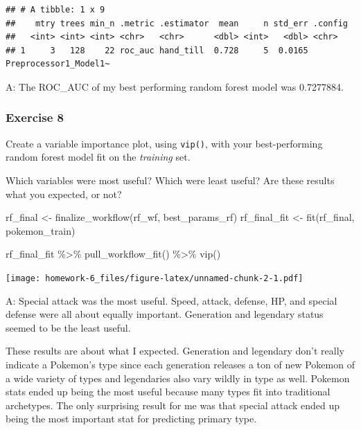 \documentclass[
]{article}
\newenvironment{Shaded}{\begin{snugshade}}{\end{snugshade}}
\newcommand{\FunctionTok}[1]{\textcolor[rgb]{0.00,0.00,0.00}{#1}}
\newcommand{\NormalTok}[1]{#1}
\newcommand{\OtherTok}[1]{\textcolor[rgb]{0.56,0.35,0.01}{#1}}
\newcommand{\SpecialCharTok}[1]{\textcolor[rgb]{0.00,0.00,0.00}{#1}}
\begin{document}
\begin{verbatim}
## # A tibble: 1 x 9
##    mtry trees min_n .metric .estimator  mean     n std_err .config              
##   <int> <int> <int> <chr>   <chr>      <dbl> <int>   <dbl> <chr>                
## 1     3   128    22 roc_auc hand_till  0.728     5  0.0165 Preprocessor1_Model1~
\end{verbatim}

A: The ROC\_AUC of my best performing random forest model was 0.7277884.

\hypertarget{exercise-8}{%
\subsubsection{Exercise 8}\label{exercise-8}}

Create a variable importance plot, using \texttt{vip()}, with your
best-performing random forest model fit on the \emph{training} set.

Which variables were most useful? Which were least useful? Are these
results what you expected, or not?

\begin{Shaded}
\begin{Highlighting}[]
\NormalTok{rf\_final }\OtherTok{\textless{}{-}} \FunctionTok{finalize\_workflow}\NormalTok{(rf\_wf, best\_params\_rf)}
\NormalTok{rf\_final\_fit }\OtherTok{\textless{}{-}} \FunctionTok{fit}\NormalTok{(rf\_final, pokemon\_train)}

\NormalTok{rf\_final\_fit }\SpecialCharTok{\%\textgreater{}\%}
  \FunctionTok{pull\_workflow\_fit}\NormalTok{() }\SpecialCharTok{\%\textgreater{}\%}
  \FunctionTok{vip}\NormalTok{()}
\end{Highlighting}
\end{Shaded}

\texttt{[image: homework-6\_files/figure-latex/unnamed-chunk-2-1.pdf]}

A: Special attack was the most useful. Speed, attack, defense, HP, and
special defense were all about equally important. Generation and
legendary status seemed to be the least useful.

These results are about what I expected. Generation and legendary don't
really indicate a Pokemon's type since each generation releases a ton of
new Pokemon of a wide variety of types and legendaries also vary wildly
in type as well. Pokemon stats ended up being the most useful because
many types fit into traditional archetypes. The only surprising result
for me was that special attack ended up being the most important stat
for predicting primary type.
\end{document}
